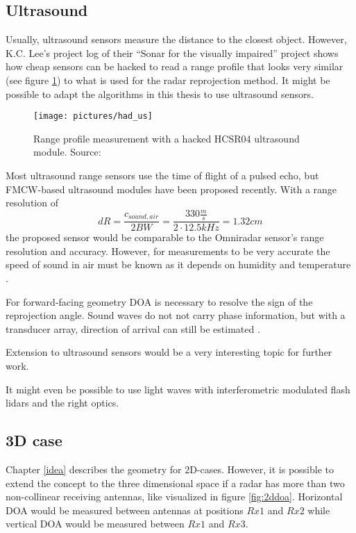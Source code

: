 \subsection{Ultrasound}\label{ultrasound}

Usually, ultrasound sensors measure the distance to the closest object.
However, K.C. Lee's project log of their ``Sonar for the visually
impaired'' project \cite{Lee2015} shows how cheap sensors can be hacked
to read a range profile that looks very similar (see figure \cref{fig:had_us}) to
what is used for the radar reprojection method. It might be possible to
adapt the algorithms in this thesis to use ultrasound sensors.

\begin{figure}[htp]
    \centering
    \texttt{[image: pictures/had\_us]}
    \caption{\label{fig:had_us}Range profile measurement with a hacked HCSR04 ultrasound module. Source: \cite{Lee2015}}
\end{figure}

Most ultrasound range sensors use the time of flight of a pulsed echo,
but FMCW-based ultrasound modules have been proposed
\cite{Battaglini2014} recently. With a range resolution of
\[dR = \frac{c_{sound, air}}{2 BW} = \frac{330 \frac{m}{s}}{2\cdot 12.5kHz} = 1.32 cm\]
the proposed sensor would be comparable to the Omniradar sensor's range
resolution and accuracy. However, for measurements to be very accurate
the speed of sound in air must be known as it depends on humidity and
temperature \cite{Bohn1987}.

For forward-facing geometry DOA is necessary to resolve the sign of the
reprojection angle. Sound waves do not not carry phase information, but
with a transducer array, direction of arrival can still be estimated
\cite{Kunin2010}.

Extension to ultrasound sensors would be a very interesting topic for
further work.

It might even be possible to use light waves with interferometric
modulated flash lidars and the right optics.

\subsection{3D case}\label{three-d-case}

Chapter \cref{idea} describes the geometry for 2D-cases. However, it
is possible to extend the concept to the three dimensional space if a
radar has more than two non-collinear receiving antennas, like
visualized in figure \cref{fig:2ddoa}. Horizontal DOA would be measured between
antennas at positions \(Rx1\) and \(Rx2\) while vertical DOA would be
measured between \(Rx1\) and \(Rx3\).

